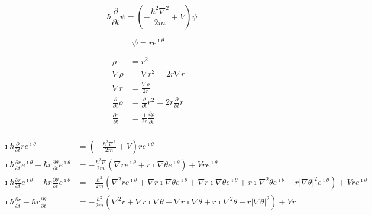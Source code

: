 \documentclass[11pt]{article}
\begin{document}
\begin{equation}
	\imath \hbar \frac{\partial}{\partial t} \psi = (- \frac{\hbar^2 \nabla^2}{2m} + V ) \psi
\end{equation}

\begin{equation}
\psi = r e ^{\imath \theta}
\end{equation}

\begin{equation}
\begin{aligned}
\rho &= r^2 \\
\nabla \rho &= \nabla r^2 = 2 r \nabla r \\
\nabla r &= \frac{\nabla \rho}{2r} \\
\frac{\partial}{\partial t} \rho &= \frac{\partial}{\partial t} r^2 = 2 r  \frac{\partial}{\partial t} r \\
\frac{\partial r}{\partial t} &= \frac{1}{2r} \frac{\partial \rho}{\partial t} \\
\end{aligned}
\end{equation}

\begin{equation}
\begin{aligned}
	\imath \hbar \frac{\partial}{\partial t} r e ^{\imath \theta} &= (- \frac{\hbar^2 \nabla^2}{2m} + V ) r e ^{\imath \theta} \\
	\imath \hbar \frac{\partial r}{\partial t} e ^{\imath \theta} - \hbar r \frac{\partial \theta}{\partial t} e ^{\imath \theta} &= - \frac{\hbar^2 \nabla}{2m} (\nabla r e ^{\imath \theta} + r \imath \nabla \theta e ^{\imath \theta} ) + V r e ^{\imath \theta} \\
	\imath \hbar \frac{\partial r}{\partial t} e ^{\imath \theta} - \hbar r \frac{\partial \theta}{\partial t} e ^{\imath \theta} &= - \frac{\hbar^2}{2m} (\nabla ^2 r e ^{\imath \theta} + \nabla r \imath \nabla \theta e ^{\imath \theta} + \nabla r \imath \nabla \theta e ^{\imath \theta} + r \imath \nabla^2 \theta e ^{\imath \theta} - r | \nabla \theta |^2 e ^{\imath \theta} ) + V r e ^{\imath \theta} \\
	\imath \hbar \frac{\partial r}{\partial t} - \hbar r \frac{\partial \theta}{\partial t} &= - \frac{\hbar^2}{2m} (\nabla ^2 r + \nabla r \imath \nabla \theta + \nabla r \imath \nabla \theta + r \imath \nabla^2 \theta - r | \nabla \theta |^2 ) + V r \\
\end{aligned}
\end{equation}
	
\end{document}
